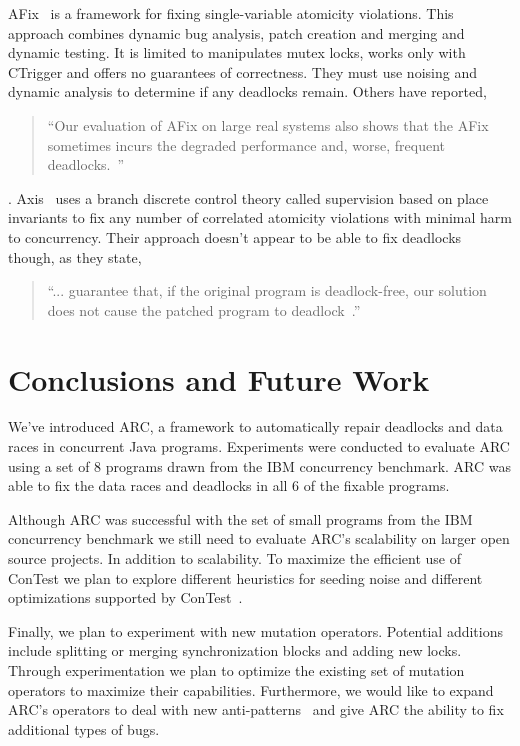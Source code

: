 \documentclass{llncs}
\begin{document}
AFix~\cite{JSZL+11} is a framework for fixing single-variable atomicity violations. This approach combines dynamic bug analysis, patch creation and merging and dynamic testing. It is limited to manipulates mutex locks, works only with CTrigger and offers no guarantees of correctness.  They must use noising and dynamic analysis to determine if any deadlocks remain.  
Others have reported, \begin{quote}``Our evaluation of AFix on large real systems also shows that the AFix sometimes incurs the degraded performance and, worse, frequent deadlocks.~\cite{LZ12}''\end{quote}. Axis~\cite{LZ12} uses a branch discrete control theory called supervision based on place invariants to fix any number of correlated atomicity violations with minimal harm to concurrency. Their approach doesn't appear to be able to fix deadlocks though, as they state,  \begin{quote}``... guarantee that, if the original program is deadlock-free, our solution does not cause the patched program to deadlock~\cite{LZ12}.''\end{quote}

\section{Conclusions and Future Work}
\label{sec:conclusion}

We've introduced ARC, a framework to automatically repair deadlocks and data races in concurrent Java programs. Experiments were conducted to evaluate ARC using a set of 8 programs drawn from the IBM concurrency benchmark. ARC was able to fix the data races and deadlocks in all 6 of the fixable programs.

Although ARC was successful with the set of small programs from the IBM concurrency benchmark we still need to evaluate ARC's scalability on larger open source projects. In addition to scalability. To maximize the efficient use of ConTest we plan to explore different heuristics for seeding noise and different optimizations supported by ConTest~\cite{KLVU10}.


Finally, we plan to experiment with new mutation operators. Potential additions include splitting or merging synchronization blocks and adding new locks. Through experimentation we plan to optimize the existing set of mutation operators to maximize their capabilities.  Furthermore, we would like to expand ARC's operators to deal with new anti-patterns~\cite{BJ09, FKLV12, BCD06} and give ARC the ability to fix additional types of bugs.



\end{document}
